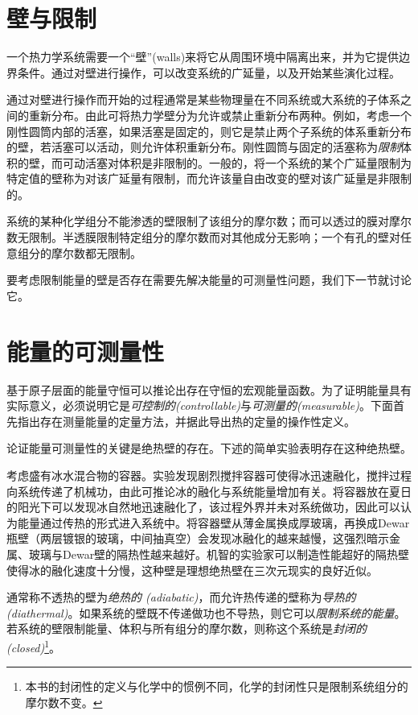 \section{壁与限制}
\label{sec1.6}
一个热力学系统需要一个“壁”(walls)来将它从周围环境中隔离出来，并为它提供边界条件。通过对壁进行操作，可以改变系统的广延量，以及开始某些演化过程。

通过对壁进行操作而开始的过程通常是某些物理量在不同系统或大系统的子体系之间的重新分布。由此可将热力学壁分为允许或禁止重新分布两种。例如，考虑一个刚性圆筒内部的活塞，如果活塞是固定的，则它是禁止两个子系统的体系重新分布的壁，若活塞可以活动，则允许体积重新分布。刚性圆筒与固定的活塞称为{\it 限制}体积的壁，而可动活塞对体积是非限制的。一般的，将一个系统的某个广延量限制为特定值的壁称为对该广延量有限制，而允许该量自由改变的壁对该广延量是非限制的。

系统的某种化学组分不能渗透的壁限制了该组分的摩尔数；而可以透过的膜对摩尔数无限制。半透膜限制特定组分的摩尔数而对其他成分无影响；一个有孔的壁对任意组分的摩尔数都无限制。

要考虑限制能量的壁是否存在需要先解决能量的可测量性问题，我们下一节就讨论它。

\section{能量的可测量性}
\label{sec1.7}
基于原子层面的能量守恒可以推论出存在守恒的宏观能量函数。为了证明能量具有实际意义，必须说明它是{\it 可控制的(controllable)}与{\it 可测量的(measurable)}。下面首先指出存在测量能量的定量方法，并据此导出热的定量的操作性定义。

论证能量可测量性的关键是绝热壁的存在。下述的简单实验表明存在这种绝热壁。

考虑盛有冰水混合物的容器。实验发现剧烈搅拌容器可使得冰迅速融化，搅拌过程向系统传递了机械功，由此可推论冰的融化与系统能量增加有关。将容器放在夏日的阳光下可以发现冰自然地迅速融化了，该过程外界并未对系统做功，因此可以认为能量通过传热的形式进入系统中。将容器壁从薄金属换成厚玻璃，再换成Dewar瓶壁（两层镀银的玻璃，中间抽真空）会发现冰融化的越来越慢，这强烈暗示金属、玻璃与Dewar壁的隔热性越来越好。机智的实验家可以制造性能超好的隔热壁使得冰的融化速度十分慢，这种壁是理想绝热壁在三次元现实的良好近似。

通常称不透热的壁为{\it 绝热的 (adiabatic)}，而允许热传递的壁称为{\it 导热的 (diathermal)}。如果系统的壁既不传递做功也不导热，则它可以{\it 限制系统的能量}。若系统的壁限制能量、体积与所有组分的摩尔数，则称这个系统是{\it 封闭的 (closed)}\footnote{本书的封闭性的定义与化学中的惯例不同，化学的封闭性只是限制系统组分的摩尔数不变。}。

